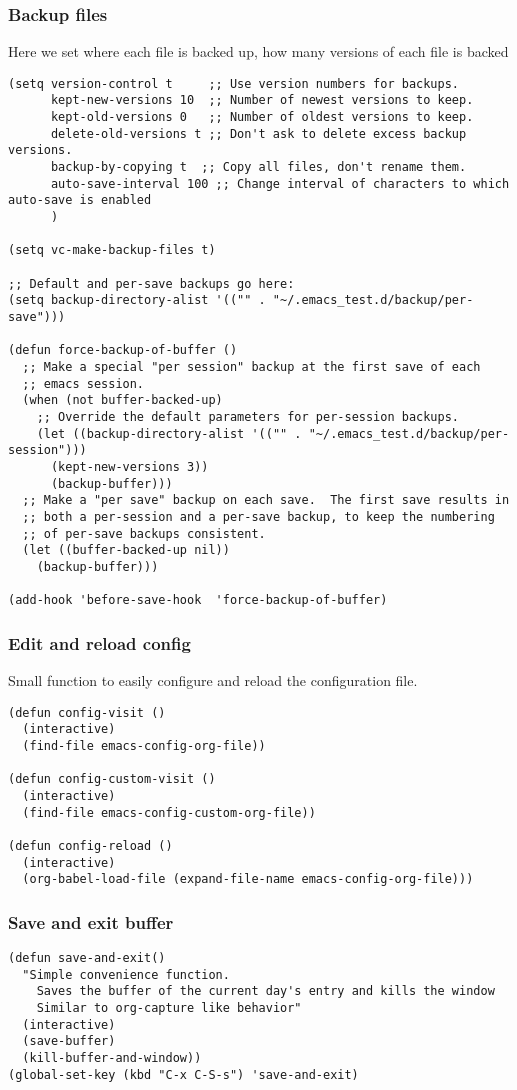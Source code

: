 \documentclass[11pt]{article}
\begin{document}
\subsubsection{Backup files}
\label{sec:org88ff930}
Here we set where each file is backed up, how many versions of each file is backed
\begin{verbatim}
(setq version-control t     ;; Use version numbers for backups.
      kept-new-versions 10  ;; Number of newest versions to keep.
      kept-old-versions 0   ;; Number of oldest versions to keep.
      delete-old-versions t ;; Don't ask to delete excess backup versions.
      backup-by-copying t  ;; Copy all files, don't rename them.
      auto-save-interval 100 ;; Change interval of characters to which auto-save is enabled
      )

(setq vc-make-backup-files t)

;; Default and per-save backups go here:
(setq backup-directory-alist '(("" . "~/.emacs_test.d/backup/per-save")))

(defun force-backup-of-buffer ()
  ;; Make a special "per session" backup at the first save of each
  ;; emacs session.
  (when (not buffer-backed-up)
    ;; Override the default parameters for per-session backups.
    (let ((backup-directory-alist '(("" . "~/.emacs_test.d/backup/per-session")))
	  (kept-new-versions 3))
      (backup-buffer)))
  ;; Make a "per save" backup on each save.  The first save results in
  ;; both a per-session and a per-save backup, to keep the numbering
  ;; of per-save backups consistent.
  (let ((buffer-backed-up nil))
    (backup-buffer)))

(add-hook 'before-save-hook  'force-backup-of-buffer)
\end{verbatim}
\subsubsection{Edit and reload config}
\label{sec:orga85d23f}
Small function to easily configure and reload the configuration file.

\begin{verbatim}
(defun config-visit ()
  (interactive)
  (find-file emacs-config-org-file))

(defun config-custom-visit ()
  (interactive)
  (find-file emacs-config-custom-org-file))

(defun config-reload ()
  (interactive)
  (org-babel-load-file (expand-file-name emacs-config-org-file)))
\end{verbatim}
\subsubsection{Save and exit buffer}
\label{sec:org6814505}
\begin{verbatim}
(defun save-and-exit()
  "Simple convenience function.
    Saves the buffer of the current day's entry and kills the window
    Similar to org-capture like behavior"
  (interactive)
  (save-buffer)
  (kill-buffer-and-window))
(global-set-key (kbd "C-x C-S-s") 'save-and-exit)
\end{verbatim}
\end{document}
